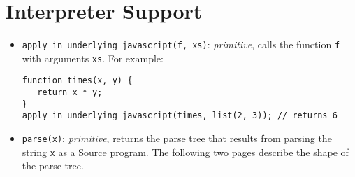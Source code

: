 \section*{Interpreter Support}

\begin{itemize}
\item \lstinline{apply_in_underlying_javascript(f, xs)}: \textit{primitive}, calls the function \lstinline{f}
with arguments \lstinline{xs}. For example:
\begin{lstlisting}
function times(x, y) {
   return x * y;
}
apply_in_underlying_javascript(times, list(2, 3)); // returns 6
\end{lstlisting}
\item \lstinline{parse(x)}: \textit{primitive}, returns the parse tree that results from parsing
the string \lstinline{x} as a Source program. The following two pages describe the shape of the parse tree.
\end{itemize}

\newpage
{}
\recalctypearea

